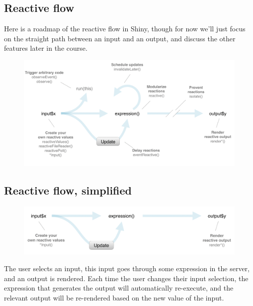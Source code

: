 \documentclass[
  letterpaper,
  DIV=11,
  numbers=noendperiod]{scrreprt}
\begin{document}
\hypertarget{reactive-flow-2}{%
\subsection{Reactive flow}\label{reactive-flow-2}}

Here is a roadmap of the reactive flow in Shiny, though for now we'll
just focus on the straight path between an input and an output, and
discuss the other features later in the course.

\begin{figure}

{\centering \includegraphics[width=1\textwidth,height=\textheight]{./images/reactive-flow.png}

}

\end{figure}

\hypertarget{reactive-flow-simplified}{%
\subsection{Reactive flow, simplified}\label{reactive-flow-simplified}}

\begin{figure}

{\centering \includegraphics[width=1\textwidth,height=\textheight]{./images/reactive-flow-simple.png}

}

\end{figure}

The user selects an input, this input goes through some expression in
the server, and an output is rendered. Each time the user changes their
input selection, the expression that generates the output will
automatically re-execute, and the relevant output will be re-rendered
based on the new value of the input.
\end{document}
